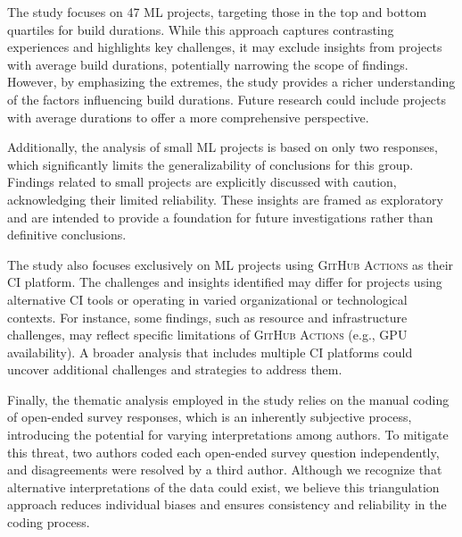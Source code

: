 The study focuses on 47 ML projects, targeting those in the top and bottom quartiles for build durations. While this approach captures contrasting experiences and highlights key challenges, it may exclude insights from projects with average build durations, potentially narrowing the scope of findings. However, by emphasizing the extremes, the study provides a richer understanding of the factors influencing build durations. Future research could include projects with average durations to offer a more comprehensive perspective.

Additionally, the analysis of small ML projects is based on only two responses, which significantly limits the generalizability of conclusions for this group. Findings related to small projects are explicitly discussed with caution, acknowledging their limited reliability. These insights are framed as exploratory and are intended to provide a foundation for future investigations rather than definitive conclusions.

The study also focuses exclusively on ML projects using \textsc{GitHub Actions} as their CI platform. The challenges and insights identified may differ for projects using alternative CI tools or operating in varied organizational or technological contexts. For instance, some findings, such as resource and infrastructure challenges, may reflect specific limitations of \textsc{GitHub Actions} (e.g., GPU availability). A broader analysis that includes multiple CI platforms could uncover additional challenges and strategies to address them.

Finally, the thematic analysis employed in the study relies on the manual coding of open-ended survey responses, which is an inherently subjective process, introducing the potential for varying interpretations among authors. To mitigate this threat, two authors coded each open-ended survey question independently, and disagreements were resolved by a third author. Although we recognize that alternative interpretations of the data could exist, we believe this triangulation approach reduces individual biases and ensures consistency and reliability in the coding process.